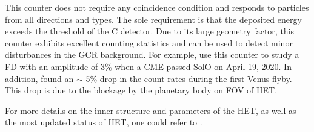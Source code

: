 This counter does not require any coincidence condition and responds to particles from all directions and types. The sole requirement is that the deposited energy exceeds the threshold of the C detector. Due to its large geometry factor, this counter exhibits excellent counting statistics and can be used to detect minor disturbances in the \ac{GCR} background. For example, \citet{Forstner-2021-SolO} use this counter to study a \ac{FD} with an amplitude of 3\% when a \ac{CME} passed \ac{SolO} on April 19, 2020. In addition, \citet{Allen2021AA_venus} found an $\sim$ 5\% drop in the count rates during the first Venus flyby. This drop is due to the blockage by the planetary body  on \ac{FOV} of \ac{HET}.



For more details on the inner structure and parameters of the \ac{HET}, as well as the most updated status of \ac{HET}, one could refer to \citet{Elftmann-2020-PhD, RodriguezPacheco-2019-EPD, Wimmer2021AA}.


